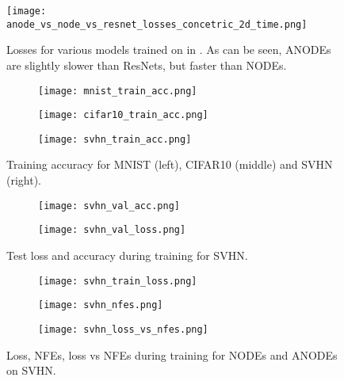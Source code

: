 \documentclass{article}
\begin{document}
\begin{figure}[t]
\begin{center}
\texttt{[image: anode\_vs\_node\_vs\_resnet\_losses\_concetric\_2d\_time.png]}
\end{center}
\caption{Losses for various models trained on  in . As can be seen, ANODEs are slightly slower than ResNets, but faster than NODEs.}
\label{resnet-anode-node-compare}
\end{figure}

\begin{figure}[t]
\centering
\begin{subfigure}[t]{0.32\linewidth}
\centering
\texttt{[image: mnist\_train\_acc.png]}
\end{subfigure}
\begin{subfigure}[t]{0.32\linewidth}
\centering
\texttt{[image: cifar10\_train\_acc.png]}
\end{subfigure}
\begin{subfigure}[t]{0.32\linewidth}
\centering
\texttt{[image: svhn\_train\_acc.png]}
\end{subfigure}
\caption{Training accuracy for MNIST (left), CIFAR10 (middle) and SVHN (right).}
\label{img-train-acc}
\end{figure}

\begin{figure}[t]
\centering
\begin{subfigure}[t]{0.45\linewidth}
\centering
\texttt{[image: svhn\_val\_acc.png]}
\end{subfigure}
\begin{subfigure}[t]{0.45\linewidth}
\centering
\texttt{[image: svhn\_val\_loss.png]}
\end{subfigure}
\caption{Test loss and accuracy during training for SVHN.}
\label{svhn-test-acc-loss}
\end{figure}

\begin{figure}[t]
\centering
\begin{subfigure}[t]{0.32\linewidth}
\centering
\texttt{[image: svhn\_train\_loss.png]}
\end{subfigure}
\begin{subfigure}[t]{0.32\linewidth}
\centering
\texttt{[image: svhn\_nfes.png]}
\end{subfigure}
\begin{subfigure}[t]{0.32\linewidth}
\centering
\texttt{[image: svhn\_loss\_vs\_nfes.png]}
\end{subfigure}
\caption{Loss, NFEs, loss vs NFEs during training for NODEs and ANODEs on SVHN.}
\label{svhn-training-results}
\end{figure}
\end{document}
